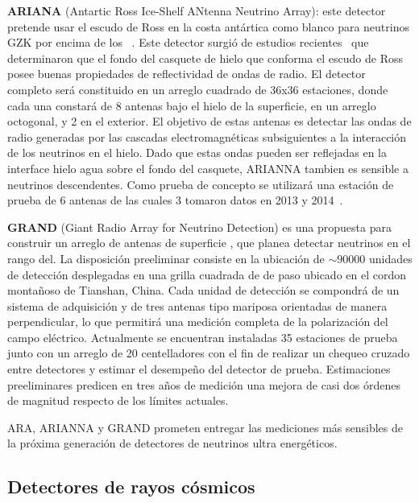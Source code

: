 	\textbf{ARIANA} (Antartic Ross Ice-Shelf ANtenna Neutrino Array): este detector pretende usar el escudo de Ross en la costa ant\'artica como blanco para neutrinos GZK por encima de los ~\cite{cite:ARIANNA}.
	Este detector surgi\'o de estudios recientes~\cite{cite:ARIANNA2} que determinaron que el fondo del casquete de hielo que conforma el escudo de Ross posee buenas propiedades de reflectividad de ondas de radio.
	El detector completo ser\'a constituido en un arreglo cuadrado de 36x36 estaciones, donde cada una constar\'a de 8 antenas bajo el hielo de la superficie, en un arreglo octogonal, y 2 en el exterior.
	El objetivo de estas antenas es detectar las ondas de radio generadas por las cascadas electromagn\'eticas subsiguientes a la interacci\'on de los neutrinos en el hielo. Dado que estas ondas pueden ser reflejadas en la interface hielo agua sobre el fondo del casquete, ARIANNA tambien es sensible a neutrinos descendentes.
	Como prueba de concepto se utilizar\'a una estaci\'on de prueba de 6 antenas de las cuales 3 tomaron datos en 2013 y 2014~\cite{cite:ARIANNA3}.
	
	\textbf{GRAND} (Giant Radio Array for Neutrino Detection) es una propuesta para construir un arreglo de antenas de superficie , que planea detectar neutrinos en el rango del. 
	La disposici\'on preeliminar consiste en la ubicaci\'on de $\sim90000$ unidades de detecci\'on desplegadas en una grilla cuadrada de  de paso ubicado en el cordon monta\~noso de Tianshan, China.
	Cada unidad de detecci\'on se compondr\'a de un sistema de adquisici\'on y de tres antenas tipo mariposa orientadas de manera perpendicular, lo que permitir\'a una medici\'on completa de la polarizaci\'on del campo el\'ectrico. 
	Actualmente se encuentran instaladas 35 estaciones de prueba junto con un arreglo de 20 centelladores con el fin de realizar un chequeo cruzado entre detectores y estimar el desempe\~no del detector de prueba.
	Estimaciones preeliminares predicen en tres a\~nos de medici\'on una mejora de casi dos \'ordenes de magnitud respecto de los l\'imites actuales.
	
	ARA, ARIANNA y GRAND prometen entregar las mediciones m\'as sensibles de la pr\'oxima generaci\'on de detectores de neutrinos ultra energ\'eticos.
	
	\subsection{Detectores de rayos c\'osmicos}
	
